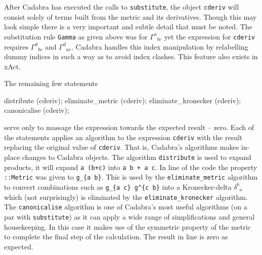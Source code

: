 \documentclass[a4paper,12pt]{article}
\numberwithin{equation}{section}%
\begin{document}
After Cadabra has executed the calls to \verb|substitute|, the object \verb|cderiv| will
consist solely of terms built from the metric and its derivatives. Though this may look
simple there is a very important and subtle detail that must be noted. The substitution rule
\verb|Gamma| as given above was for $\Gamma^{a}{}_{bc}$ yet the expression for \verb|cderiv|
requires $\Gamma^{d}{}_{bc}$ and $\Gamma^{d}{}_{ac}$. Cadabra handles this index
manipulation by relabelling dummy indices in such a way as to avoid index clashes. This
feature also exists in xAct. %


The remaining few statements

\bgroup
\lstset{firstnumber=28}
\begin{cadabra}
   distribute          (cderiv);
   eliminate_metric    (cderiv);
   eliminate_kronecker (cderiv);
   canonicalise        (cderiv);
\end{cadabra}
\egroup

serve only to massage the expression towards the expected result -- zero. Each of the
statements applies an algorithm to the expression \verb|cderiv| with the result replacing
the original value of \verb|cderiv|. That is, Cadabra's algorithms makes in-place changes to
Cadabra objects. The algorithm \verb|distribute| is used to expand products, it will expand
\verb|a (b+c)| into \verb|a b + a c|. In line  of the code the property
\verb|::Metric| was given to \verb|g_{a b}|. This is used by the \verb|eliminate_metric|
algorithm to convert combinations such as \verb|g_{a c} g^{c b}| into a Kronecker-delta
$\delta^b{}_a$ which (not surprisingly) is eliminated by the \verb|eliminate_kronecker|
algorithm. The \verb|canonicalise| algorithm is one of Cadabra's most useful algorithms (on
a par with \verb|substitute|) as it can apply a wide range of simplifications and general
housekeeping. In this case it makes use of the symmetric property of the metric to complete
the final step of the calculation. The result in line  is zero as expected.
\end{document}
